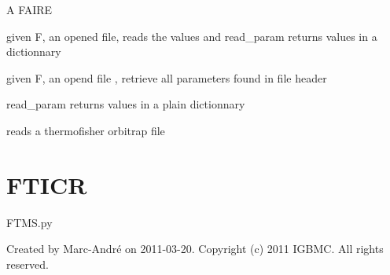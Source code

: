 \documentclass[letterpaper,10pt,openany,oneside]{sphinxmanual}
\begin{document}

\begin{fulllineitems}
\label{rst/code:File.Thermo.Thermo_Tests}
A FAIRE

\end{fulllineitems}


\begin{fulllineitems}
\label{rst/code:File.Thermo.read_data}
given F, an opened file, reads the values and 
read\_param returns  values in a dictionnary

\end{fulllineitems}


\begin{fulllineitems}
\label{rst/code:File.Thermo.read_param}
given F, an opend file , retrieve all parameters found in file header

read\_param returns  values in a plain dictionnary

\end{fulllineitems}


\begin{fulllineitems}
\label{rst/code:File.Thermo.read_thermo}
reads a thermofisher orbitrap file

\end{fulllineitems}



\section{FTICR}
\label{rst/code:fticr}\label{rst/code:module-FTICR}
FTMS.py

Created by Marc-André on 2011-03-20.
Copyright (c) 2011 IGBMC. All rights reserved.
\end{document}

